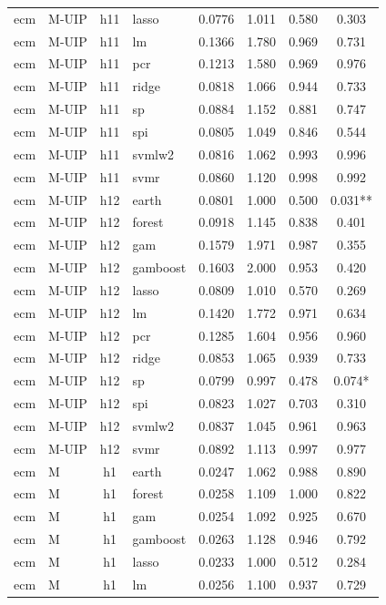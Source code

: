 \begin{ThreePartTable}
\begin{longtable}[t]{llclcccc}
ecm & M-UIP & h11 & lasso & 0.0776 & 1.011 & 0.580 & 0.303\\
ecm & M-UIP & h11 & lm & 0.1366 & 1.780 & 0.969 & 0.731\\
ecm & M-UIP & h11 & pcr & 0.1213 & 1.580 & 0.969 & 0.976\\
ecm & M-UIP & h11 & ridge & 0.0818 & 1.066 & 0.944 & 0.733\\
ecm & M-UIP & h11 & sp & 0.0884 & 1.152 & 0.881 & 0.747\\
ecm & M-UIP & h11 & spi & 0.0805 & 1.049 & 0.846 & 0.544\\
ecm & M-UIP & h11 & svmlw2 & 0.0816 & 1.062 & 0.993 & 0.996\\
ecm & M-UIP & h11 & svmr & 0.0860 & 1.120 & 0.998 & 0.992\\
\addlinespace
ecm & M-UIP & h12 & earth & 0.0801 & 1.000 & 0.500 & 0.031**\\
ecm & M-UIP & h12 & forest & 0.0918 & 1.145 & 0.838 & 0.401\\
ecm & M-UIP & h12 & gam & 0.1579 & 1.971 & 0.987 & 0.355\\
ecm & M-UIP & h12 & gamboost & 0.1603 & 2.000 & 0.953 & 0.420\\
ecm & M-UIP & h12 & lasso & 0.0809 & 1.010 & 0.570 & 0.269\\
ecm & M-UIP & h12 & lm & 0.1420 & 1.772 & 0.971 & 0.634\\
ecm & M-UIP & h12 & pcr & 0.1285 & 1.604 & 0.956 & 0.960\\
ecm & M-UIP & h12 & ridge & 0.0853 & 1.065 & 0.939 & 0.733\\
ecm & M-UIP & h12 & sp & 0.0799 & 0.997 & 0.478 & 0.074*\\
ecm & M-UIP & h12 & spi & 0.0823 & 1.027 & 0.703 & 0.310\\
ecm & M-UIP & h12 & svmlw2 & 0.0837 & 1.045 & 0.961 & 0.963\\
ecm & M-UIP & h12 & svmr & 0.0892 & 1.113 & 0.997 & 0.977\\
\addlinespace
ecm & M & h1 & earth & 0.0247 & 1.062 & 0.988 & 0.890\\
ecm & M & h1 & forest & 0.0258 & 1.109 & 1.000 & 0.822\\
ecm & M & h1 & gam & 0.0254 & 1.092 & 0.925 & 0.670\\
ecm & M & h1 & gamboost & 0.0263 & 1.128 & 0.946 & 0.792\\
ecm & M & h1 & lasso & 0.0233 & 1.000 & 0.512 & 0.284\\
ecm & M & h1 & lm & 0.0256 & 1.100 & 0.937 & 0.729\\

\end{longtable}
\end{ThreePartTable}
